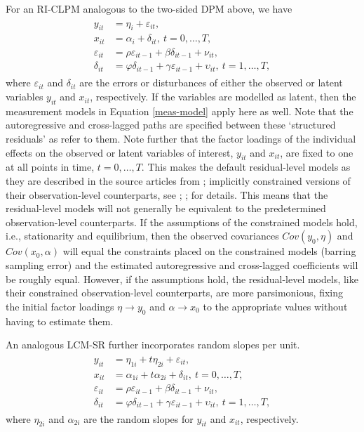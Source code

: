 \documentclass[]{interact}
\theoremstyle{plain}%
\theoremstyle{definition}
\theoremstyle{remark}
\begin{document}
For an RI-CLPM analogous to the two-sided DPM above, we have
\begin{align}
\begin{split}
y_{it} & = \eta_{i} + \varepsilon_{it}, \\
x_{it} & = \alpha_{i} + \delta_{it}, \ t = 0, \ldots, T, \\
\varepsilon_{it} & = \rho \varepsilon_{it-1} + \beta \delta_{it-1} + \nu_{it}, \\
\delta_{it} & = \varphi \delta_{it-1} + \gamma \varepsilon_{it-1} + \upsilon_{it}, \ t = 1, \ldots, T, \label{riclpm}
\end{split}
\end{align} where \(\varepsilon_{it}\) and \(\delta_{it}\) are the
errors or disturbances of either the observed or latent variables
\(y_{it}\) and \(x_{it}\), respectively. If the variables are modelled
as latent, then the measurement models in Equation \eqref{meas-model}
apply here as well. Note that the autoregressive and cross-lagged paths
are specified between these `structured residuals' as \citet{Curran2014}
refer to them. Note further that the factor loadings of the individual
effects on the observed or latent variables of interest, \(y_{it}\) and
\(x_{it}\), are fixed to one at all points in time,
\(t = 0, \ldots, T\). This makes the default residual-level models as
they are described in the source articles from \citet{Curran2014};
\citet{Hamaker2015} implicitly constrained versions of their
observation-level counterparts, see \citet{Andersen2021};
\citet{Ou2016}; \citet{Hsiao2014} for details. This means that the
residual-level models will not generally be equivalent to the
predetermined observation-level counterparts. If the assumptions of the
constrained models hold, i.e., stationarity and equilibrium, then the
observed covariances \(Cov(y_{0},\eta)\) and \(Cov(x_{0},\alpha)\) will
equal the constraints placed on the constrained models (barring sampling
error) and the estimated autoregressive and cross-lagged coefficients
will be roughly equal. However, if the assumptions hold, the
residual-level models, like their constrained observation-level
counterparts, are more parsimonious, fixing the initial factor loadings
\(\eta \rightarrow y_{0}\) and \(\alpha \rightarrow x_{0}\) to the
appropriate values without having to estimate them.

An analogous LCM-SR further incorporates random slopes per unit.
\begin{align}
\begin{split}
y_{it} & = \eta_{1i} + t\eta_{2i} + \varepsilon_{it}, \\
x_{it} & = \alpha_{1i} + t\alpha_{2i} + \delta_{it}, \ t = 0, \ldots, T, \\
\varepsilon_{it} & = \rho \varepsilon_{it-1} + \beta \delta_{it-1} + \nu_{it}, \\
\delta_{it} & = \varphi \delta_{it-1} + \gamma \varepsilon_{it-1} + \upsilon_{it}, \ t = 1, \ldots, T, \label{riclpm}
\end{split}
\end{align} where \(\eta_{2i}\) and \(\alpha_{2i}\) are the random
slopes for \(y_{it}\) and \(x_{it}\), respectively.
\end{document}
